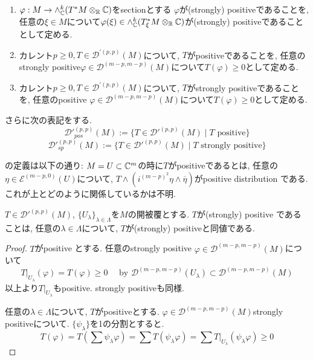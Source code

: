 \begin{tcolorbox}[mybox]
\begin{defn}
\label{defn-M-6.4.5}
\begin{enumerate}
\item $\varphi : M \to \wedge_{\mathbb{C}}^{k}(T^{*}M \otimes_{\mathbb{R}} \mathbb{C})$をsectionとする
$\varphi$が(strongly) positiveであることを, 
任意の$\xi \in M$について$\varphi(\xi) \in\wedge_{\mathbb{C}}^{k}(T^{*}_{\xi}M \otimes_{\mathbb{R}} \mathbb{C})$が(strongly) positiveであることとして定める.  
\item カレント$p \ge 0, T \in \mathcal{D}^{'(p,p)}(M)$について, 
$T$がpositiveであることを, 任意のstrongly positive$\varphi \in  \mathcal{D}^{(m-p,m-p)}(M)$について$T(\varphi) \ge 0$として定める. 
\item カレント$p \ge 0, T \in \mathcal{D}^{'(p,p)}(M)$について, 
$T$がstrongly positiveであることを, 任意のpositive $\varphi \in  \mathcal{D}^{(m-p,m-p)}(M)$について$T(\varphi) \ge 0$として定める. 
\end{enumerate}
さらに次の表記をする. 
$$
{\mathcal{D}'}^{(p,p)}_{pos}(M)
:= \{ T \in {\mathcal{D}'}^{(p,p)}(M) \mid \text{$T$ positive} \}
$$
$$
{\mathcal{D}'}^{(p,p)}_{sp}(M)
:= \{ T \in {\mathcal{D}'}^{(p,p)}(M) \mid \text{$T$ strongly positive} \}
$$
\end{defn}
\end{tcolorbox}

\begin{rem}
\cite{NO}の定義は以下の通り:
$M=U \subset \mathbb{C}^m$の時に$T$がpositiveであるとは, 任意の$\eta \in \mathcal{E}^{(m-p, 0)}(U)$について, 
$T \wedge (i^{(m-p)^2} \eta \wedge \overline{\eta})$がpositive distribution である. 
これが上とどのように関係しているかは不明. 
\end{rem}


\begin{tcolorbox}[mybox]
\begin{lem}
\label{lem-M-7.4.2}
$T \in {\mathcal{D}'}^{(p,p)}(M)$, $\{U_\lambda \}_{\lambda \in \Lambda}$を$M$の開被覆とする. 
$T$が(strongly) positive であることは, 任意の$\lambda \in \Lambda$について, $T$が(strongly) positiveと同値である.  
\end{lem}
\end{tcolorbox}
\begin{proof}
$T$がpositive とする. 
任意のstrongly positive $\varphi \in  \mathcal{D}^{(m-p,m-p)}(M)$について
$$
T|_{U_\lambda}(\varphi )
=T(\varphi) \ge 0
\quad\text{ by }
\mathcal{D}^{(m-p,m-p)}(U_\lambda) \subset \mathcal{D}^{(m-p,m-p)}(M) 
$$
以上より$T|_{U_\lambda}$もpositive. strongly positiveも同様.

任意の$\lambda \in \Lambda$について, $T$がpositiveとする. 
$\varphi \in  \mathcal{D}^{(m-p,m-p)}(M)$strongly positiveについて. 
$\{\psi_\lambda\}$を1の分割とすると.
$$
T(\varphi)
= T(\sum \psi_\lambda \varphi)
= \sum T(\psi_\lambda \varphi) 
=\sum T|_{U_\lambda}(\psi_\lambda \varphi) 
 \ge 0
$$
\end{proof}



